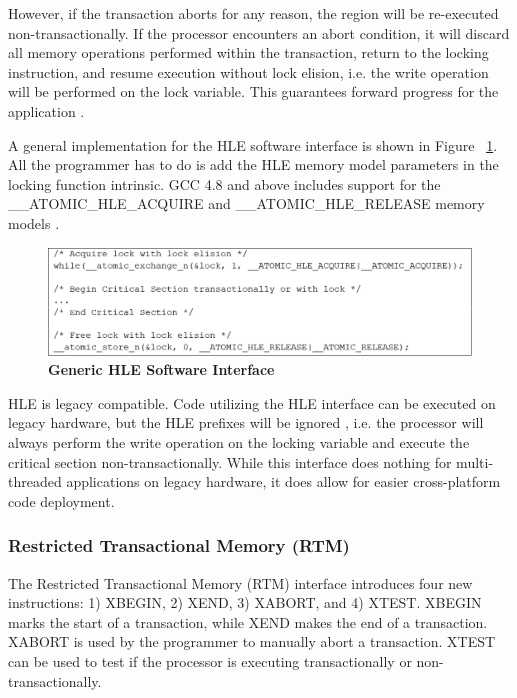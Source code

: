 \documentclass[a4paper]{article}
\begin{document}
\indent 
However, if the transaction aborts for any reason, the region will be
re-executed non-transactionally.  If the processor encounters an abort
condition, it will discard all memory operations performed within the
transaction, return to the locking instruction, and resume execution without
lock elision, i.e. the write operation will be performed on the lock variable.
This guarantees forward progress for the application \cite{intel_prog_ref}.
\par

\indent 
A general implementation for the HLE software interface is shown in Figure
~\ref{fig:hle_interface}.  All the programmer has to do is add the HLE memory
model parameters in the locking function intrinsic.  GCC 4.8 and above includes
support for the \_\_ATOMIC\_HLE\_ACQUIRE and \_\_ATOMIC\_HLE\_RELEASE memory
models \cite{gcc}.
\par

\begin{figure}[H]
    \centering
    \graphicspath{ {./figures/} }
    \includegraphics[width=\textwidth,height=\textheight,keepaspectratio]{fig_hleInterface}
    \caption{\textbf{Generic HLE Software Interface}}
    \label{fig:hle_interface}
\end{figure}

\indent
HLE is legacy compatible.  Code utilizing the HLE interface can be executed on
legacy hardware, but the HLE prefixes will be ignored \cite{intel_prog_ref},
i.e. the processor will always perform the write operation on the locking
variable and execute the critical section non-transactionally.  While this
interface does nothing for multi-threaded applications on legacy hardware, it
does allow for easier cross-platform code deployment.
\par

\subsubsection{\textbf{Restricted Transactional Memory (RTM)}}\label{sec:rtm}

\indent 
The Restricted Transactional Memory (RTM) interface introduces four new
instructions: 1) XBEGIN, 2) XEND, 3) XABORT, and 4) XTEST.  XBEGIN marks the
start of a transaction, while XEND makes the end of a transaction.  XABORT is
used by the programmer to manually abort a transaction.  XTEST can be used to
test if the processor is executing transactionally or non-transactionally.
\par
\end{document}
